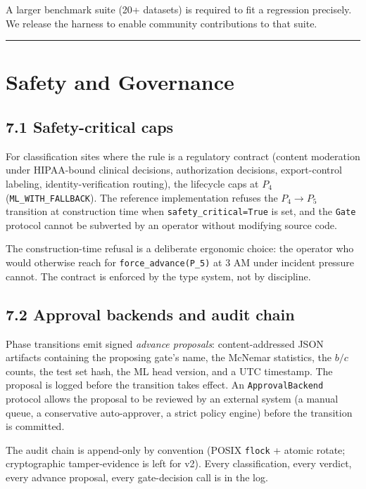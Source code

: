 A larger benchmark suite (20+ datasets) is required to fit a regression
precisely. We release the harness to enable community contributions to
that suite.

\begin{center}\rule{0.5\linewidth}{0.5pt}\end{center}

\section{Safety and Governance}\label{safety-and-governance}

\subsection{7.1 Safety-critical caps}\label{safety-critical-caps}

For classification sites where the rule is a regulatory contract
(content moderation under HIPAA-bound clinical decisions, authorization
decisions, export-control labeling, identity-verification routing), the
lifecycle caps at \(P_4\) (\texttt{ML\_WITH\_FALLBACK}). The reference
implementation refuses the \(P_4 \to P_5\) transition at construction
time when \texttt{safety\_critical=True} is set, and the \texttt{Gate}
protocol cannot be subverted by an operator without modifying source
code.

The construction-time refusal is a deliberate ergonomic choice: the
operator who would otherwise reach for \texttt{force\_advance(P\_5)} at
3 AM under incident pressure cannot. The contract is enforced by the
type system, not by discipline.

\subsection{7.2 Approval backends and audit
chain}\label{approval-backends-and-audit-chain}

Phase transitions emit signed \emph{advance proposals}:
content-addressed JSON artifacts containing the proposing gate's name,
the McNemar statistics, the \(b/c\) counts, the test set hash, the ML
head version, and a UTC timestamp. The proposal is logged before the
transition takes effect. An \texttt{ApprovalBackend} protocol allows the
proposal to be reviewed by an external system (a manual queue, a
conservative auto-approver, a strict policy engine) before the
transition is committed.

The audit chain is append-only by convention (POSIX \texttt{flock} +
atomic rotate; cryptographic tamper-evidence is left for v2). Every
classification, every verdict, every advance proposal, every
gate-decision call is in the log.

